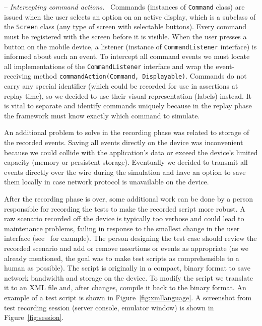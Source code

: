 \documentclass{llncs}
\newcommand{\internalsection}[1]{\par\medskip\noindent-- \emph{#1}~}
\newcommand{\method}[1]{\texttt{#1}}       %
\newcommand{\class}[1]{\texttt{#1}}        %
\newcommand{\interface}[1]{\texttt{#1}}    %
\begin{document}
\internalsection{Intercepting command actions.} Commands (instances of \class{Command} class) are issued
when the user selects an option on an active display, which is a subclass of the \class{Screen} class
(any type of screen with selectable buttons). Every command must be registered with the screen
before it is visible. When the user presses a button on the mobile device, a listener (instance of
\interface{CommandListener} interface) is informed about such an event. To intercept all command events
we must locate all implementations of the \interface{CommandListener} interface and wrap the
event-receiving method \method{commandAction(Command, Displayable)}.
%
Commands do not carry any special identifier (which could be recorded for use in assertions at
replay time), so we decided to use their visual representation (labels) instead. It is vital to
separate and identify commands uniquely because in the replay phase the framework must know exactly
which command to simulate.

\medskip%
An additional problem to solve in the recording phase was related to storage of the
recorded events. Saving all events directly on the device was inconvenient because we could collide
with the application's data or exceed the device's limited capacity (memory or persistent storage).
Eventually we decided to transmit all events directly over the wire during the simulation and have
an option to save them locally in case network protocol is unavailable on the device.

After the recording phase is over, some additional work can be done by a person responsible for
recording the tests to make the recorded script more robust.
A raw scenario recorded off the device is typically too verbose and could
lead to maintenance problems, failing in response to the smallest change in the user
interface (see~\cite{sta99} for example). The person designing the test case should review the
recorded scenario and add or remove assertions or events as appropriate (as we already mentioned,
the goal was to make test scripts as comprehensible to a human as possible). The script
is originally in a compact, binary format to save network bandwidth and storage on the device.
To modify the script we translate it to an XML file and, after changes, compile it back to the
binary format. An example of a test script is shown in Figure~\vref{fig:xmllanguage}. 
A screenshot from test recording session (server console, emulator window) is shown in 
Figure~\vref{fig:session}.



\end{document}
